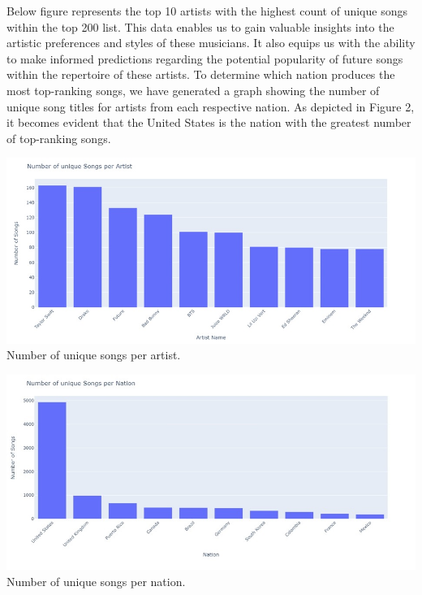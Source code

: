 \documentclass{article}
\begin{document}
Below figure represents the top 10 artists with the highest count of unique songs within the top 200 list. This data enables us to gain valuable insights into the artistic preferences and styles of these musicians. It also equips us with the ability to make informed predictions regarding the potential popularity of future songs within the repertoire of these artists.
To determine which nation produces the most top-ranking songs, we have generated a graph showing the number of unique song titles for artists from each respective nation. As depicted in Figure 2, it becomes evident that the United States is the nation with the greatest number of top-ranking songs.
\begin{center}
  \centering
  \begin{minipage}{0.5\textwidth}
    \centering
    \includegraphics[width=\linewidth]{Untitled1.jpg}
    \footnotesize{Number of unique songs per artist.}
  \end{minipage}\hfill
  \begin{minipage}{0.5\textwidth}
    \centering
    \includegraphics[width=\linewidth]{Untitled2.jpg}
    \footnotesize{Number of unique songs per nation.}
  \end{minipage}
\end{center}
\end{document}
